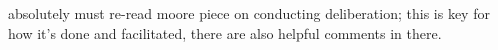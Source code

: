 absolutely must re-read moore piece on conducting deliberation; this is key for how it's done and facilitated, there are also helpful comments in there.

